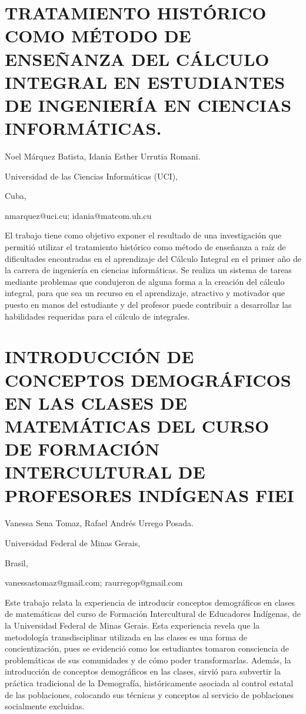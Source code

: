\section{TRATAMIENTO HISTÓRICO COMO MÉTODO DE ENSEÑANZA DEL CÁLCULO INTEGRAL
EN ESTUDIANTES DE INGENIERÍA EN CIENCIAS INFORMÁTICAS.}

\begin{datos}

Noel Márquez Batista, Idania Esther Urrutia Romani. 

Universidad de las Ciencias Informáticas (UCI),

Cuba,

nmarquez@uci.cu; idania@matcom.uh.cu

\end{datos}

El trabajo tiene como objetivo exponer el resultado de una investigación
que permitió utilizar el tratamiento histórico como método de enseñanza
a raíz de dificultades encontradas en el aprendizaje del Cálculo Integral
en el primer año de la carrera de ingeniería en ciencias informáticas.
Se realiza un sistema de tareas mediante problemas que condujeron
de alguna forma a la creación del cálculo integral, para que sea un
recurso en el aprendizaje, atractivo y motivador que puesto en manos
del estudiante y del profesor puede contribuir a desarrollar las habilidades
requeridas para el cálculo de integrales. 


\section{INTRODUCCIÓN DE CONCEPTOS DEMOGRÁFICOS EN LAS CLASES DE MATEMÁTICAS
DEL CURSO DE FORMACIÓN INTERCULTURAL DE PROFESORES INDÍGENAS FIEI}

\begin{datos}

Vanessa Sena Tomaz, Rafael Andrés Urrego Posada.

Universidad Federal de Minas Gerais,

Brasil,

vanessastomaz@gmail.com; raurregop@gmail.com

\end{datos}

Este trabajo relata la experiencia de introducir conceptos demográficos
en clases de matemáticas del curso de Formación Intercultural de Educadores
Indígenas, de la Universidad Federal de Minas Gerais. Esta experiencia
revela que la metodología transdisciplinar utilizada en las clases
es una forma de concientización, pues se evidenció como los estudiantes
tomaron consciencia de problemáticas de sus comunidades y de cómo
poder transformarlas. Además, la introducción de conceptos demográficos
en las clases, sirvió para subvertir la práctica tradicional de la
Demografía, históricamente asociada al control estatal de las poblaciones,
colocando sus técnicas y conceptos al servicio de poblaciones socialmente
excluidas.


